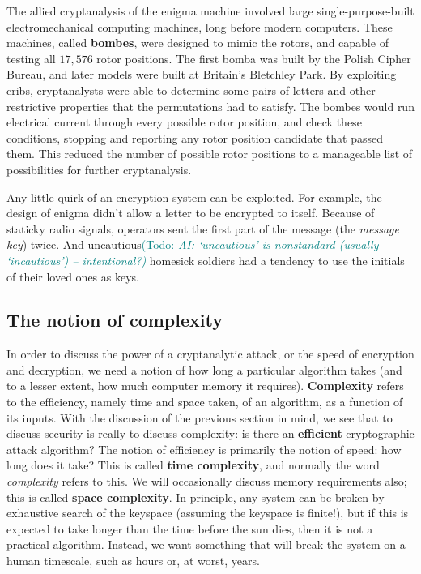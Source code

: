 \documentclass{article}
\theoremstyle{plain}
\theoremstyle{definition}
\theoremstyle{remark}
\numberwithin{theorem}{section}
\newcommand{\todo}[1]{\textcolor{teal}{{\sf (Todo:} {\sl{#1})}}}
\newcommand{\todo}[1]{}
\begin{document}
The allied cryptanalysis of the enigma machine involved large single-purpose-built electromechanical computing machines, long before modern computers.  These machines, called \textbf{bombes}, were designed to mimic the rotors, and capable of testing all $17,576$ rotor positions.  The first bomba was built by the Polish Cipher Bureau, and later models were built at Britain's Bletchley Park.  By exploiting cribs, cryptanalysts were able to determine some pairs of letters and other restrictive properties that the permutations had to satisfy.  The bombes would run electrical current through every possible rotor position, and check these conditions, stopping and reporting any rotor position candidate that passed them.  This reduced the number of possible rotor positions to a manageable list of possibilities for further cryptanalysis.

Any little quirk of an encryption system can be exploited.  For example, the design of enigma didn't allow a letter to be encrypted to itself.  Because of staticky radio signals, operators sent the first part of the message (the \emph{message key}) twice.  And uncautious\todo{AI: `uncautious' is nonstandard (usually `incautious') -- intentional?} homesick soldiers had a tendency to use the initials of their loved ones as keys.


\subsection{The notion of complexity}

In order to discuss the power of a cryptanalytic attack, or the speed of encryption and decryption, we need a notion of how long a particular algorithm takes (and to a lesser extent, how much computer memory it requires).  \textbf{Complexity} refers to the efficiency, namely time and space taken, of an algorithm, as a function of its inputs.  With the discussion of the previous section in mind, we see that to discuss security is really to discuss complexity:  is there an \textbf{efficient} cryptographic attack algorithm?  The notion of efficiency is primarily the notion of speed:  how long does it take?  This is called \textbf{time complexity}, and normally the word \emph{complexity} refers to this.  We will occasionally discuss memory requirements also; this is called \textbf{space complexity}.  In principle, any system can be broken by exhaustive search of the keyspace (assuming the keyspace is finite!), but if this is expected to take longer than the time before the sun dies, then it is not a practical algorithm.  Instead, we want something that will break the system on a human timescale, such as hours or, at worst, years.
\end{document}
